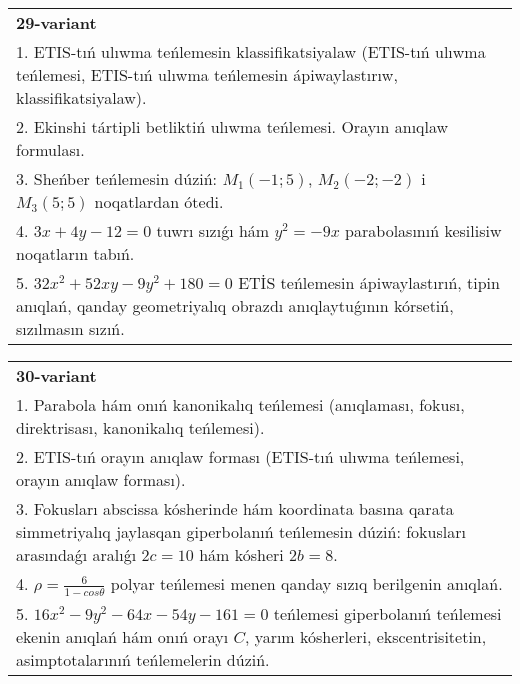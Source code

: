 \documentclass{article}
\begin{document}
\begin{tabular}{m{17cm}}
\textbf{29-variant}\\
1. ETIS-tıń ulıwma teńlemesin klassifikatsiyalaw (ETIS-tıń ulıwma teńlemesi, ETIS-tıń ulıwma teńlemesin ápiwaylastırıw, klassifikatsiyalaw).\\

2. Ekinshi tártipli betliktiń ulıwma teńlemesi. Orayın anıqlaw formulası.\\

3. Sheńber teńlemesin dúziń: $M_1 (-1;5) $, $M_2 (-2;-2) $ i $M_3 (5;5) $ noqatlardan ótedi.\\

4. $3x + 4y - 12 = 0$ tuwrı sızıǵı hám $y^{2} = - 9x$ parabolasınıń kesilisiw noqatların tabıń.  \\

5. $32x^{2} + 52xy - 9y^{2} + 180 = 0$ ETİS teńlemesin ápiwaylastırıń, tipin anıqlań, qanday geometriyalıq obrazdı anıqlaytuǵının kórsetiń, sızılmasın sızıń.  
\end{tabular}
\vspace{1cm}


\begin{tabular}{m{17cm}}
\textbf{30-variant}\\
1. Parabola hám onıń kanonikalıq teńlemesi (anıqlaması, fokusı, direktrisası, kanonikalıq teńlemesi).\\

2. ETIS-tıń orayın anıqlaw forması (ETIS-tıń ulıwma teńlemesi, orayın anıqlaw forması).\\

3. Fokusları abscissa kósherinde hám koordinata basına qarata simmetriyalıq jaylasqan giperbolanıń teńlemesin dúziń: fokusları arasındaǵı aralıǵı $2 c=10$ hám kósheri $2 b=8$.\\

4. $\rho = \frac{6}{1 - cos\theta}$ polyar teńlemesi menen qanday sızıq berilgenin anıqlań.  \\

5. $16x^{2} - 9y^{2} - 64x - 54y - 161 = 0$ teńlemesi giperbolanıń teńlemesi ekenin anıqlań hám onıń orayı $C$, yarım kósherleri, ekscentrisitetin, asimptotalarınıń teńlemelerin dúziń.  
\end{tabular}
\vspace{1cm}
\end{document}
